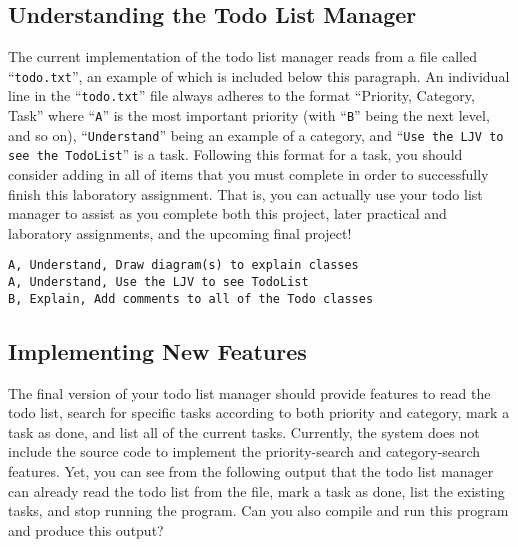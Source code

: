 \vspace{-0.1in}
\subsection*{Understanding the Todo List Manager}
\vspace{-0.05in}

The current implementation of the todo list manager reads from a file called ``{\tt todo.txt}'', an example of which is
included below this paragraph. An individual line in the ``{\tt todo.txt}'' file always adheres to the format
``Priority, Category, Task'' where ``{\tt A}'' is the most important priority (with ``{\tt B}'' being the next level,
  and so on), ``{\tt Understand}'' being an example of a category, and ``{\tt Use the LJV to see the TodoList}'' is a
task.  Following this format for a task, you should consider adding in all of items that you must complete in order to
successfully finish this laboratory assignment. That is, you can actually use your todo list manager to assist as
you complete both this project, later practical and laboratory assignments, and the upcoming final project!

\vspace{-0.05in}
\begin{verbatim}
A, Understand, Draw diagram(s) to explain classes
A, Understand, Use the LJV to see TodoList
B, Explain, Add comments to all of the Todo classes 
\end{verbatim}
\vspace{-0.05in}

\vspace{-0.15in}
\subsection*{Implementing New Features}
\vspace{-0.05in}

The final version of your todo list manager should provide features to read the todo list, search for specific tasks
according to both priority and category, mark a task as done, and list all of the current tasks.  Currently, the system
does not include the source code to implement the priority-search and category-search features. Yet, you can see
from the following output that the todo list manager can already read the todo list from the file, mark a task as done,
list the existing tasks, and stop running the program. Can you also compile and run this program and produce this
output?

